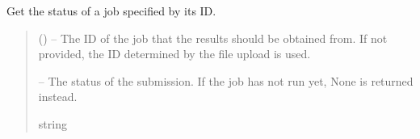 \documentclass[letterpaper,11pt,english]{sphinxmanual}
\begin{document}
\begin{savenotes}
\begin{fulllineitems}
\begin{savenotes}\begin{fulllineitems}
\label{\detokenize{code/opihiexarata.astrometry.webclient:opihiexarata.astrometry.webclient.AstrometryNetWebAPIEngine.get_job_status}}
\pysigstartsignatures
{}
\pysigstopsignatures
\sphinxAtStartPar
Get the status of a job specified by its ID.
\begin{quote}\begin{description}
\sphinxAtStartPar
{} (\sphinxstyleliteralemphasis{\sphinxupquote{, }}) – The ID of the job that the results should be obtained from. If not
provided, the ID determined by the file upload is used.

\sphinxAtStartPar
{} – The status of the submission. If the job has not run yet, None is
returned instead.

\sphinxAtStartPar
string

\end{description}\end{quote}

\end{fulllineitems}\end{savenotes}



\end{fulllineitems}
\end{savenotes}
\end{document}
